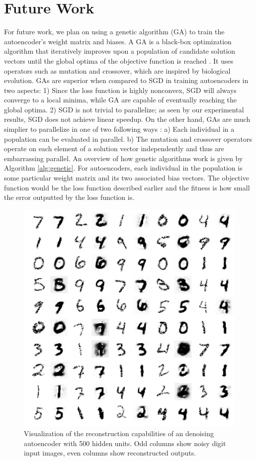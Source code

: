 \documentclass[conference]{IEEEtran}
\begin{document}
\section{Future Work}
For future work, we plan on using a genetic algorithm (GA) to train the autoencoder's weight matrix and biases. A GA is a black-box optimization algorithm that iteratively improves upon a population of candidate solution vectors until the global optima of the objective function is reached \cite{srinivas1994genetic}. It uses operators such as mutation and crossover, which are inspired by biological evolution. GAs are superior when compared to SGD in training autoencoders in two aspects: 1) Since the loss function is highly nonconvex, SGD will always converge to a local minima, while GA are capable of eventually reaching the global optima. 2) SGD is not trivial to parallelize; as seen by our experimental results, SGD does not achieve linear speedup. On the other hand, GAs are much simplier to parallelize in one of two following ways \cite{cantu1998survey}: a) Each individual in a population can be evaluated in parallel. b) The mutation and crossover operators operate on each element of a solution vector independently and thus are embarrassing parallel. An overview of how genetic algorithms work is given by Algorithm \ref{alg:genetic}. For autoencoders, each individual in the population is some particular weight matrix and its two associated bias vectors. The objective function would be the loss function described earlier and the fitness is how small the error outputted by the loss function is. 

\begin{figure}[h]
\centering
\includegraphics[width=1.0\linewidth]{experiment3_2.png}
\caption{Visualization of the reconstruction capabilities of an denoising autoencoder with 500 hidden units. Odd columns show noisy digit input images, even columns show reconstructed outputs.}
\label{fig:experiment3_2}
\end{figure}
\end{document}
